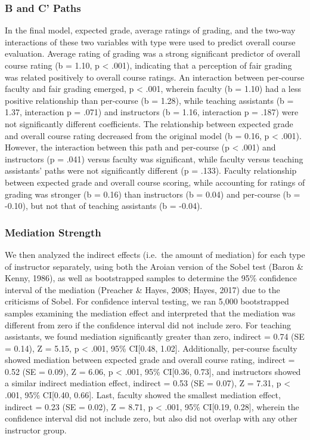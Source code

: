 \documentclass[,man]{apa6}
\theoremstyle{definition}
\theoremstyle{definition}
\theoremstyle{definition}
\theoremstyle{remark}
\begin{document}
\subsubsection{B and C' Paths}\label{b-and-c-paths}

In the final model, expected grade, average ratings of grading, and the
two-way interactions of these two variables with type were used to
predict overall course evaluation. Average rating of grading was a
strong significant predictor of overall course rating (b = 1.10, p
\textless{} .001), indicating that a perception of fair grading was
related positively to overall course ratings. An interaction between
per-course faculty and fair grading emerged, p \textless{} .001, wherein
faculty (b = 1.10) had a less positive relationship than per-course (b =
1.28), while teaching assistants (b = 1.37, interaction p = .071) and
instructors (b = 1.16, interaction p = .187) were not significantly
different coefficients. The relationship between expected grade and
overall course rating decreased from the original model (b = 0.16, p
\textless{} .001). However, the interaction between this path and
per-course (p \textless{} .001) and instructors (p = .041) versus
faculty was significant, while faculty versus teaching assistants' paths
were not significantly different (p = .133). Faculty relationship
between expected grade and overall course scoring, while accounting for
ratings of grading was stronger (b = 0.16) than instructors (b = 0.04)
and per-course (b = -0.10), but not that of teaching assistants (b =
-0.04).

\subsubsection{Mediation Strength}\label{mediation-strength}

We then analyzed the indirect effects (i.e.~the amount of mediation) for
each type of instructor separately, using both the Aroian version of the
Sobel test (Baron \& Kenny, 1986), as well as bootstrapped samples to
determine the 95\% confidence interval of the mediation (Preacher \&
Hayes, 2008; Hayes, 2017) due to the criticisms of Sobel. For confidence
interval testing, we ran 5,000 bootstrapped samples examining the
mediation effect and interpreted that the mediation was different from
zero if the confidence interval did not include zero. For teaching
assistants, we found mediation significantly greater than zero, indirect
= 0.74 (SE = 0.14), Z = 5.15, p \textless{} .001, 95\% CI{[}0.48,
1.02{]}. Additionally, per-course faculty showed mediation between
expected grade and overall course rating, indirect = 0.52 (SE = 0.09), Z
= 6.06, p \textless{} .001, 95\% CI{[}0.36, 0.73{]}, and instructors
showed a similar indirect mediation effect, indirect = 0.53 (SE = 0.07),
Z = 7.31, p \textless{} .001, 95\% CI{[}0.40, 0.66{]}. Last, faculty
showed the smallest mediation effect, indirect = 0.23 (SE = 0.02), Z =
8.71, p \textless{} .001, 95\% CI{[}0.19, 0.28{]}, wherein the
confidence interval did not include zero, but also did not overlap with
any other instructor group.
\end{document}
